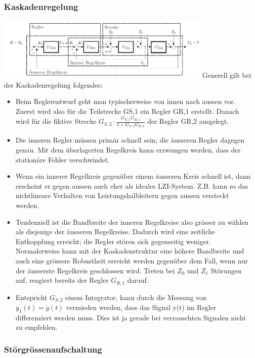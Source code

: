 \subsubsection{Kaskadenregelung }
\begin{multicols}{2}
\includegraphics[width=10.5cm]{./images/KaskadenRegelung.png}
Generell gilt bei der Kaskadenregelung folgendes:
\begin{itemize}
\item Beim Reglerentwurf geht man typischerweise von innen nach aussen vor. Zuerst
wird also für die Teilstrecke GS,1 ein Regler GR,1 erstellt. Danach wird für die
fiktive Strecke $G_{S,2} \cdot \frac{G_{S,1}G_{R,1}}{1+G_{S,1}G_{R,1}}$
der Regler GR,2 ausgelegt.
\item Die inneren Regler müssen primär schnell sein; die äusseren Regler dagegen
genau. Mit dem überlagerten Regelkreis kann erzwungen werden, dass der stationäre Fehler verschwindet.
\item Wenn ein innerer Regelkreis gegenüber einem äusseren Kreis schnell ist, dann
erscheint er gegen aussen auch eher als ideales LZI-System. Z.B. kann so das
nichtlineare Verhalten von Leistungshalbleitern gegen aussen versteckt werden.
\item Tendenziell ist die Bandbreite der inneren Regelkreise also grösser zu wählen
als diejenige der äusseren Regelkreise. Dadurch wird eine zeitliche Entkopplung
erreicht; die Regler stören sich gegenseitig weniger.
Normalerweise kann mit der Kaskadenstruktur eine höhere Bandbreite und
auch eine grössere Robustheit erreicht werden gegenüber dem Fall, wenn nur
der äusserste Regelkreis geschlossen wird.
Treten bei $Z_0$ und $Z_1$ Störungen auf, reagiert bereits der Regler
$G_{R,1}$ darauf.
\item Entspricht  $G_{S,2}$ einem Integrator, kann durch die
Messung von $y_1(t) = \dot{y}(t)$ vermieden werden, dass das Signal y(t) im Regler
differenziert werden muss. Dies ist ja gerade bei verrauschten Signalen nicht
zu empfehlen.
\end{itemize}
\end{multicols}

\subsubsection{Störgrössenaufschaltung }


